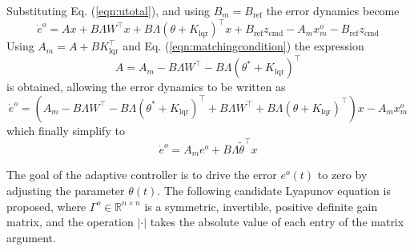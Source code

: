 \documentclass[]{../sty/aiaa-tc}
\begin{document}
  Substituting Eq. (\ref{eqn:utotal}), and using $B_{m}=B_{\text{ref}}$ the error dynamics become
  \begin{equation*}
    \dot{e}^{o}=Ax+B\Lambda W^{\top}x+B\Lambda(\theta+K_{\text{lqr}})^{\top}x+B_{\text{ref}}z_{\text{cmd}}-A_{m}x_{m}^{o}-B_{\text{ref}}z_{\text{cmd}}
  \end{equation*}
  Using $A_{m}=A+BK_{\text{lqr}}^{\top}$ and Eq. (\ref{eqn:matchingcondition}) the expression
  \begin{equation*}
    A=A_{m}-B\Lambda W^{\top}-B\Lambda(\theta^{*}+K_{\text{lqr}})^{\top}
  \end{equation*}
  is obtained, allowing the error dynamics to be written as
  \begin{equation*}
    \dot{e}^{o}=\left(A_{m}-B\Lambda W^{\top}-B\Lambda(\theta^{*}+K_{\text{lqr}})^{\top}+B\Lambda W^{\top}+B\Lambda(\theta+K_{\text{lqr}})^{\top}\right)x-A_{m}x_{m}^{o}
  \end{equation*}
  which finally simplify to
  \begin{equation}
    \label{eqn:eodotfin}
    \dot{e}^{o}=A_{m}e^{o}+B\Lambda{\tilde{\theta}}^{\top}x
  \end{equation}

  The goal of the adaptive controller is to drive the error $e^{o}(t)$ to zero by adjusting the parameter $\theta(t)$.
  The following candidate Lyapunov equation is proposed, where $\Gamma^{o}\in\mathbb{R}^{n\times n}$ is a symmetric, invertible, positive definite gain matrix, and the operation $|\cdot|$ takes the absolute value of each entry of the matrix argument.
\end{document}
